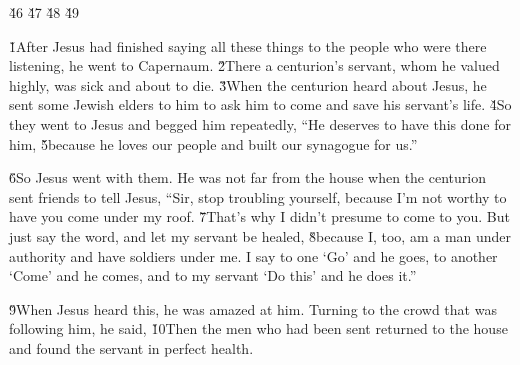 \v{46} \v{47} \v{48} \v{49}  

\v{1}After Jesus had finished saying all these things to the people who were there listening, he went to Capernaum. \v{2}There a centurion's servant, whom he valued highly, was sick and about to die. \v{3}When the centurion heard about Jesus, he sent some Jewish elders to him to ask him to come and save his servant's life. \v{4}So they went to Jesus and begged him repeatedly, ``He deserves to have this done for him, \v{5}because he loves our people and built our synagogue for us.''

\v{6}So Jesus went with them. He was not far from the house when the centurion sent friends to tell Jesus, ``Sir, stop troubling yourself, because I'm not worthy to have you come under my roof. \v{7}That's why I didn't presume to come to you. But just say the word, and let my servant be healed, \v{8}because I, too, am a man under authority and have soldiers under me. I say to one `Go' and he goes, to another `Come' and he comes, and to my servant `Do this' and he does it.''

\v{9}When Jesus heard this, he was amazed at him. Turning to the crowd that was following him, he said,  \v{10}Then the men who had been sent returned to the house and found the servant in perfect health.

